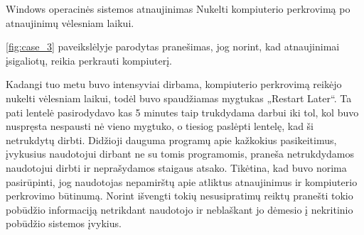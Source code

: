 ﻿\begin{xcase}{Windows operacinės sistemos atnaujinimas}
  \xcgoal
  {
    Nukelti kompiuterio perkrovimą po atnaujinimų vėlesniam laikui.
  }
  \xctools
  {
    \ref{fig:case_3} paveikslėlyje parodytas pranešimas, jog norint, kad atnaujinimai įsigaliotų, 
    reikia perkrauti kompiuterį.

  }
  \xcresult
  {
    Kadangi tuo metu buvo intensyviai dirbama, kompiuterio perkrovimą reikėjo nukelti vėlesniam 
    laikui, todėl buvo spaudžiamas mygtukas „Restart Later“. Ta pati lentelė pasirodydavo kas 5 
    minutes taip trukdydama darbui iki tol, kol buvo nuspręsta nespausti nė vieno mygtuko, o 
    tiesiog paslėpti lentelę, kad ši netrukdytų dirbti.
  }
  \xcprinciples
  {
    {
      Didžioji dauguma programų apie kažkokius pasikeitimus, įvykusius naudotojui dirbant ne su 
      tomis programomis, praneša netrukdydamos naudotojui dirbti ir neprašydamos staigaus atsako.
    }
  }
  \xcthoughts
  {
    Tikėtina, kad buvo norima pasirūpinti, jog naudotojas nepamirštų
    apie atliktus atnaujinimus ir kompiuterio perkrovimo būtinumą.
    Norint išvengti tokių nesusipratimų reiktų pranešti tokio
    pobūdžio informaciją netrikdant naudotojo ir neblaškant jo
    dėmesio į nekritinio pobūdžio sistemos įvykius.
  }
\end{xcase}
